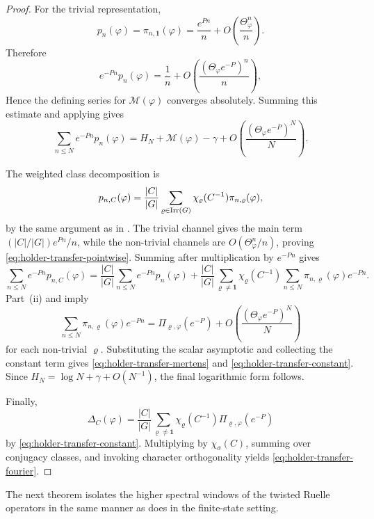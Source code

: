 \begin{proof}
  For the trivial representation,
  \[
    p_n(\varphi)=\pi_{n,\mathbf 1}(\varphi)
    =
    \frac{e^{Pn}}{n}+O\!\left(\frac{\Theta_\varphi^n}{n}\right).
  \]
  Therefore
  \[
    e^{-Pn}p_n(\varphi)
    =
    \frac{1}{n}+O\!\left(\frac{(\Theta_\varphi e^{-P})^n}{n}\right),
  \]
  Hence the defining series for \(\mathcal M(\varphi)\) converges
  absolutely. Summing this estimate and applying
   gives
  \[
    \sum_{n\le N}e^{-Pn}p_n(\varphi)
    =
    H_N+\mathcal M(\varphi)-\gamma
    +O\!\left(\frac{(\Theta_\varphi e^{-P})^N}{N}\right).
  \]

  The weighted class decomposition is
  \[
    p_{n,C}(\varphi)
    =
    \frac{|C|}{|G|}
      \sum_{\varrho\in\operatorname{Irr}(G)}
        \chi_\varrho(C^{-1})\pi_{n,\varrho}(\varphi),
  \]
  by the same argument as in
  . The trivial channel gives
  the main term \((|C|/|G|)e^{Pn}/n\), while the non-trivial channels are
  \(O(\Theta_\varphi^n/n)\), proving
  \eqref{eq:holder-transfer-pointwise}. Summing after multiplication by
  \(e^{-Pn}\) gives
  \[
    \sum_{n\le N}e^{-Pn}p_{n,C}(\varphi)
    =
    \frac{|C|}{|G|}
      \sum_{n\le N}e^{-Pn}p_n(\varphi)
    +\frac{|C|}{|G|}
      \sum_{\varrho\neq\mathbf 1}\chi_\varrho(C^{-1})
        \sum_{n\le N}\pi_{n,\varrho}(\varphi)e^{-Pn}.
  \]
  Part~\textup{(ii)} and  imply
  \[
    \sum_{n\le N}\pi_{n,\varrho}(\varphi)e^{-Pn}
    =
    \Pi_{\varrho,\varphi}(e^{-P})
    +O\!\left(\frac{(\Theta_\varphi e^{-P})^N}{N}\right)
  \]
  for each non-trivial \(\varrho\). Substituting the scalar asymptotic
  and collecting the constant term gives
  \eqref{eq:holder-transfer-mertens} and
  \eqref{eq:holder-transfer-constant}. Since
  \(H_N=\log N+\gamma+O(N^{-1})\), the final logarithmic form follows.

  Finally,
  \[
    \Delta_C(\varphi)
    =
    \frac{|C|}{|G|}
      \sum_{\varrho\neq\mathbf 1}
        \chi_\varrho(C^{-1})\Pi_{\varrho,\varphi}(e^{-P})
  \]
  by \eqref{eq:holder-transfer-constant}. Multiplying by
  \(\chi_\sigma(C)\), summing over conjugacy classes, and invoking
  character orthogonality yields
  \eqref{eq:holder-transfer-fourier}.
\end{proof}

The next theorem isolates the higher spectral windows of the twisted
Ruelle operators in the same manner as
 does in the finite-state
setting.

